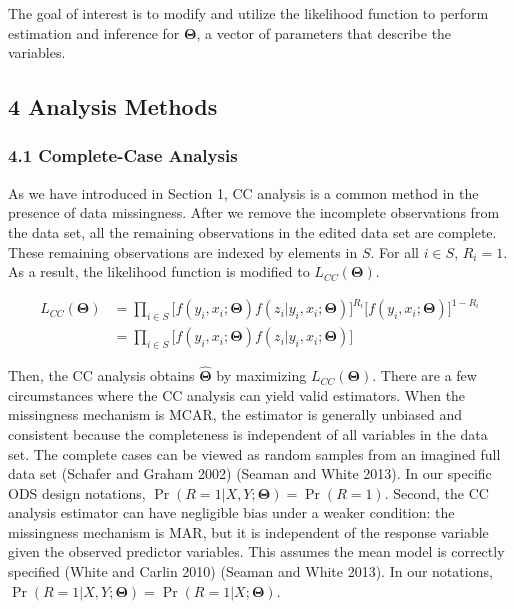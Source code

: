 \documentclass[
  12pt,
]{article}
\begin{document}
The goal of interest is to modify and utilize the likelihood function to
perform estimation and inference for \(\boldsymbol\Theta\), a vector of
parameters that describe the variables.

\hypertarget{analysis-methods}{%
\subsection{4 Analysis Methods}\label{analysis-methods}}

\hypertarget{complete-case-analysis}{%
\subsubsection{4.1 Complete-Case
Analysis}\label{complete-case-analysis}}

As we have introduced in Section 1, CC analysis is a common method in
the presence of data missingness. After we remove the incomplete
observations from the data set, all the remaining observations in the
edited data set are complete. These remaining observations are indexed
by elements in \(S\). For all \(i \in S\), \(R_i = 1\). As a result, the
likelihood function is modified to \(L_{CC}(\boldsymbol{\Theta})\).

\[
\begin{aligned}
L_{CC}(\boldsymbol\Theta) &= \prod_{i \in S} \big[ f(y_i, x_i; \boldsymbol\Theta)f(z_i|y_i, x_i; \boldsymbol\Theta) \big]^{R_i} \big[ f(y_i, x_i; \boldsymbol\Theta) \big]^{1-R_i} \\
&= \prod_{i \in S} \big[ f(y_i, x_i; \boldsymbol\Theta)f(z_i|y_i, x_i; \boldsymbol\Theta) \big]
\end{aligned}
\]

Then, the CC analysis obtains \(\hat{\boldsymbol\Theta}\) by maximizing
\(L_{CC}(\boldsymbol\Theta)\). There are a few circumstances where the
CC analysis can yield valid estimators. When the missingness mechanism
is MCAR, the estimator is generally unbiased and consistent because the
completeness is independent of all variables in the data set. The
complete cases can be viewed as random samples from an imagined full
data set (Schafer and Graham 2002) (Seaman and White 2013). In our
specific ODS design notations,
\(\Pr(R = 1|X, Y; \boldsymbol\Theta) = \Pr(R = 1)\). Second, the CC
analysis estimator can have negligible bias under a weaker condition:
the missingness mechanism is MAR, but it is independent of the response
variable given the observed predictor variables. This assumes the mean
model is correctly specified (White and Carlin 2010) (Seaman and White
2013). In our notations,
\(\Pr(R = 1|X, Y; \boldsymbol\Theta) = \Pr(R = 1 | X; \boldsymbol\Theta)\).
\end{document}
